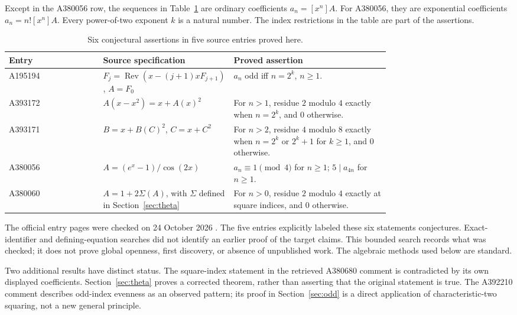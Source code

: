 \documentclass[11pt,a4paper]{article}
\theoremstyle{remark}
\newcommand{\Rev}{\operatorname{Rev}}
\begin{document}
Except in the A380056 row, the sequences in Table~\ref{tab:results} are
ordinary coefficients $a_n=[x^n]A$. For A380056, they are exponential
coefficients $a_n=n![x^n]A$. Every power-of-two exponent $k$ is a natural
number. The index restrictions in the table are part of the assertions.

\clearpage
\begin{table}[ht]
\centering\small
\begin{tabular}{@{}lp{0.34\linewidth}p{0.41\linewidth}@{}}
\toprule
Entry & Source specification & Proved assertion\\
\midrule
A195194 &
 $F_j=\Rev(x-(j+1)xF_{j+1})$, $A=F_0$ &
 $a_n$ odd iff $n=2^k$, $n\ge1$.\\[5pt]
A393172 & $A(x-x^2)=x+A(x)^2$ &
 For $n>1$, residue $2$ modulo $4$ exactly when $n=2^k$, and $0$ otherwise.\\[5pt]
A393171 & $B=x+B(C)^2$, $C=x+C^2$ &
 For $n>2$, residue $4$ modulo $8$ exactly when $n=2^k$ or $2^k+1$ for $k\ge1$, and $0$ otherwise.\\[5pt]
A380056 & $A=(e^x-1)/\cos(2x)$ &
 $a_n\equiv1\pmod4$ for $n\ge1$;
 $5\mid a_{4n}$ for $n\ge1$.\\[5pt]
A380060 & $A=1+2\Sigma(A)$, with $\Sigma$ defined in Section~\ref{sec:theta} &
 For $n>0$, residue $2$ modulo $4$ exactly at square indices, and $0$ otherwise.\\
\bottomrule
\end{tabular}
\caption{Six conjectural assertions in five source entries proved here.}
\label{tab:results}
\end{table}

The official entry pages were checked on 24 October 2026
\cite{oeis194,oeis171,oeis172,oeis056,oeis060}. The five entries explicitly
labeled these six statements conjectures. Exact-identifier and
defining-equation searches did not identify an earlier proof of the target
claims. This bounded search records what was checked; it does not prove
global openness, first discovery, or absence of unpublished work. The
algebraic methods used below are standard.

Two additional results have distinct status. The square-index statement
in the retrieved A380680 comment is contradicted by its own displayed
coefficients. Section~\ref{sec:theta} proves a corrected theorem, rather
than asserting that the original statement is true. The A392210 comment
describes odd-index evenness as an observed pattern; its proof in
Section~\ref{sec:odd} is a direct application of characteristic-two
squaring, not a new general principle.
\end{document}
